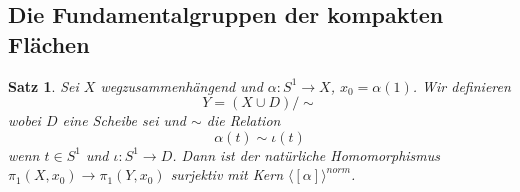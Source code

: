 \documentclass[a4paper, 12pt]{article}
\theoremstyle{plain}
\newtheorem{theorem}{Satz}[section] %
\theoremstyle{definition}
\theoremstyle{lemma}
\theoremstyle{remark}
\theoremstyle{corollary}
\theoremstyle{example}
\begin{document}
\subsection{Die Fundamentalgruppen der kompakten Flächen}
	\begin{theorem}
		Sei $X$ wegzusammenhängend und $\alpha: S^1 \to X$, $x_0 = \alpha(1)$. Wir definieren \[Y = (X \cup D)/\sim\] wobei $D$ eine Scheibe sei und $\sim$ die Relation \[\alpha(t) \sim \iota(t)\] wenn $t \in S^1$ und $\iota: S^1 \to D$. Dann ist der natürliche Homomorphismus $\pi_1(X,x_0) \to \pi_1(Y,x_0)$ surjektiv mit Kern $\langle[\alpha]\rangle^{norm}$.
	\end{theorem}
\end{document}
